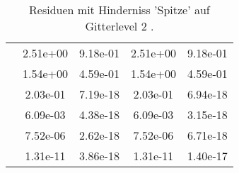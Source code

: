 \begin{table}
\begin{tabular}{c|cc|cc|}
\multicolumn{1}{|c|}{} & \multicolumn{1}{|c|}{  2.51e+00} & \multicolumn{1}{|c|}{  9.18e-01} & \multicolumn{1}{|c|}{  2.51e+00} & \multicolumn{1}{|c|}{  9.18e-01} \\ 
\multicolumn{1}{|c|}{} & \multicolumn{1}{|c|}{  1.54e+00} & \multicolumn{1}{|c|}{  4.59e-01} & \multicolumn{1}{|c|}{  1.54e+00} & \multicolumn{1}{|c|}{  4.59e-01} \\ 
\multicolumn{1}{|c|}{} & \multicolumn{1}{|c|}{  2.03e-01} & \multicolumn{1}{|c|}{  7.19e-18} & \multicolumn{1}{|c|}{  2.03e-01} & \multicolumn{1}{|c|}{  6.94e-18} \\ 
\multicolumn{1}{|c|}{} & \multicolumn{1}{|c|}{  6.09e-03} & \multicolumn{1}{|c|}{  4.38e-18} & \multicolumn{1}{|c|}{  6.09e-03} & \multicolumn{1}{|c|}{  3.15e-18} \\ 
\multicolumn{1}{|c|}{} & \multicolumn{1}{|c|}{  7.52e-06} & \multicolumn{1}{|c|}{  2.62e-18} & \multicolumn{1}{|c|}{  7.52e-06} & \multicolumn{1}{|c|}{  6.71e-18} \\ 
\multicolumn{1}{|c|}{} & \multicolumn{1}{|c|}{  1.31e-11} & \multicolumn{1}{|c|}{  3.86e-18} & \multicolumn{1}{|c|}{  1.31e-11} & \multicolumn{1}{|c|}{  1.40e-17} \\ 
\hline 
\end{tabular}\caption{Residuen mit Hinderniss 'Spitze' auf Gitterlevel 2 .}\label{tab:Residuum_Spitze_level2}
\end{table} 
